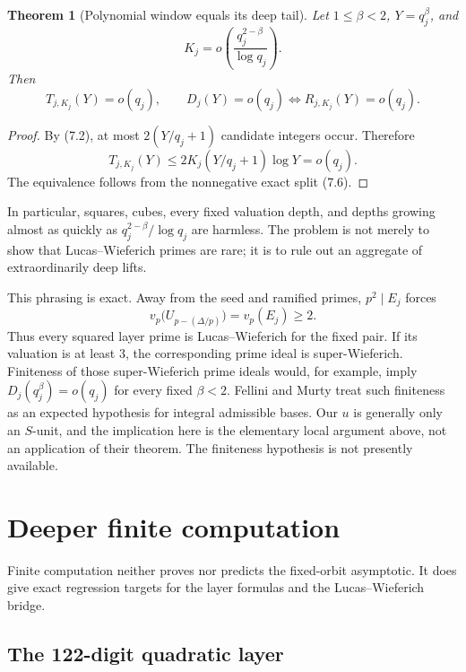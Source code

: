 \documentclass[11pt]{article}
\newtheorem{theorem}{Theorem}
\theoremstyle{definition}
\theoremstyle{remark}
\begin{document}
\begin{theorem}[Polynomial window equals its deep tail]\label{thm:deep-tail}
Let \(1\le\beta<2\), \(Y=q_j^\beta\), and
\[
 K_j=o\left(\frac{q_j^{2-\beta}}{\log q_j}\right).
\]
Then
\[
 T_{j,K_j}(Y)=o(q_j),\qquad
 D_j(Y)=o(q_j)\Longleftrightarrow R_{j,K_j}(Y)=o(q_j).
 \tag{7.7}
\]
\end{theorem}

\begin{proof}
By (7.2), at most \(2(Y/q_j+1)\) candidate integers occur.  Therefore
\[
 T_{j,K_j}(Y)
 \le2K_j(Y/q_j+1)\log Y=o(q_j).
\]
The equivalence follows from the nonnegative exact split (7.6).
\end{proof}

In particular, squares, cubes, every fixed valuation depth, and depths
growing almost as quickly as \(q_j^{2-\beta}/\log q_j\) are harmless.
The problem is not merely to show that Lucas--Wieferich primes are rare;
it is to rule out an aggregate of extraordinarily deep lifts.

This phrasing is exact.  Away from the seed and ramified primes,
\(p^2\mid E_j\) forces
\[
 v_p\bigl(U_{p-(\Delta/p)}\bigr)=v_p(E_j)\ge2.
 \tag{7.8}
\]
Thus every squared layer prime is Lucas--Wieferich for the fixed pair.
If its valuation is at least $3$, the corresponding prime ideal is
super-Wieferich.  Finiteness of those super-Wieferich prime ideals would,
for example, imply \(D_j(q_j^\beta)=o(q_j)\) for every fixed
\(\beta<2\).  Fellini and Murty treat such finiteness as an expected
hypothesis for integral admissible bases.  Our \(u\) is generally only an
\(S\)-unit, and the implication here is the elementary local argument
above, not an application of their theorem.  The finiteness hypothesis is
not presently available.

\section{Deeper finite computation}

Finite computation neither proves nor predicts the fixed-orbit
asymptotic.  It does give exact regression targets for the layer formulas
and the Lucas--Wieferich bridge.

\subsection{The 122-digit quadratic layer}
\end{document}
